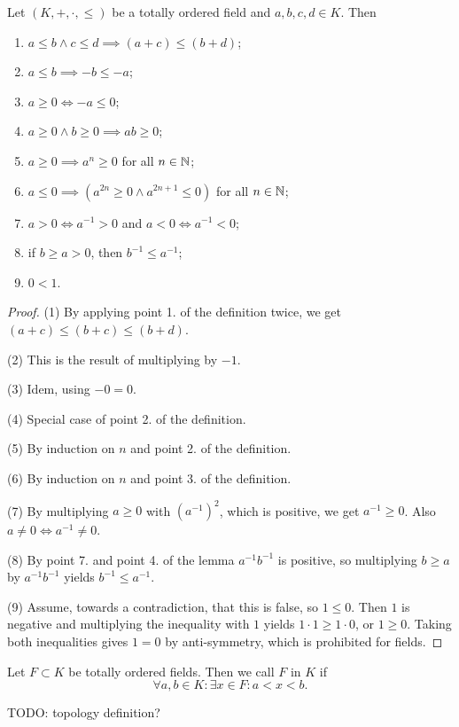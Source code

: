 \begin{lemma}
Let $(K,+,\cdot,\leq)$ be a totally ordered field and $a,b,c,d\in K$. Then
\begin{enumerate}
\item $a\leq b \land c\leq d \implies (a+c) \leq (b+d)$;
\item $a\leq b \implies -b\leq -a$;
\item $a\geq 0 \iff -a\leq 0$;
\item $a\geq 0 \land b\geq 0 \implies ab \geq 0$;
\item $a\geq 0 \implies a^n \geq 0$ for all $n\in\mathbb{N}$;
\item $a\leq 0 \implies (a^{2n} \geq 0 \land a^{2n+1}\leq 0)$ for all $n\in\mathbb{N}$;
\item $a > 0 \iff a^{-1} > 0$ and $a < 0 \iff a^{-1} < 0$;
\item if $b \geq a>0$, then $b^{-1} \leq a^{-1}$;
\item $0<1$.
\end{enumerate}
\end{lemma}
\begin{proof}
(1) By applying point 1. of the definition twice, we get $(a+c)\leq(b+c)\leq(b+d)$.

(2) This is the result of multiplying by $-1$.

(3) Idem, using $-0=0$.

(4) Special case of point 2. of the definition.

(5) By induction on $n$ and point 2. of the definition.

(6) By induction on $n$ and point 3. of the definition.

(7) By multiplying $a \geq 0$ with $(a^{-1})^{2}$, which is positive, we get $a^{-1}\geq 0$. Also $a\neq 0 \iff a^{-1}\neq 0$.

(8) By point 7. and point 4. of the lemma $a^{-1}b^{-1}$ is positive, so multiplying $b\geq a$ by $a^{-1}b^{-1}$ yields $b^{-1} \leq a^{-1}$.

(9) Assume, towards a contradiction, that this is false, so $1\leq 0$. Then $1$ is negative and multiplying the inequality with $1$ yields $1\cdot 1 \geq 1\cdot 0$, or $1\geq 0$. Taking both inequalities gives $1=0$ by anti-symmetry, which is prohibited for fields.
\end{proof}

\begin{definition}
Let $F\subset K$ be totally ordered fields. Then we call $F$  in $K$ if
\[ \forall a,b\in K: \exists x\in F: a<x<b. \]
\end{definition}
TODO: topology definition?

